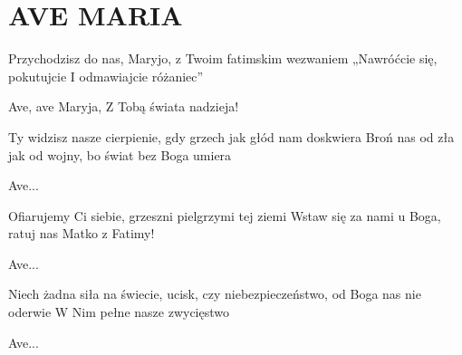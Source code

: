 \documentclass[../../../songbook.tex]{subfiles}
\begin{document}
\TabPositions{8cm} %
\section*{AVE MARIA}
{}
\vspace{0.5cm}
Przychodzisz do nas, Maryjo,		 \newline
z Twoim fatimskim wezwaniem		 \newline
„Nawróćcie się, pokutujcie			  \newline
I odmawiajcie różaniec”			 \newline

\-\hspace{1cm} Ave, ave Maryja,			 \newline
\-\hspace{1cm} Z Tobą świata nadzieja!		 \newline

Ty widzisz nasze cierpienie, \newline
gdy grzech jak głód nam doskwiera \newline
Broń nas od zła jak od wojny, \newline
bo świat bez Boga umiera \newline

\-\hspace{1cm} Ave... \newline

Ofiarujemy Ci siebie, \newline 
grzeszni pielgrzymi tej ziemi \newline
Wstaw się za nami u Boga, \newline
ratuj nas Matko z Fatimy! \newline

\-\hspace{1cm} Ave... \newline

Niech żadna siła na świecie, \newline
ucisk, czy niebezpieczeństwo, \newline
od Boga nas nie oderwie \newline
W Nim pełne nasze zwycięstwo \newline

\-\hspace{1cm} Ave... \newline
\end{document}
